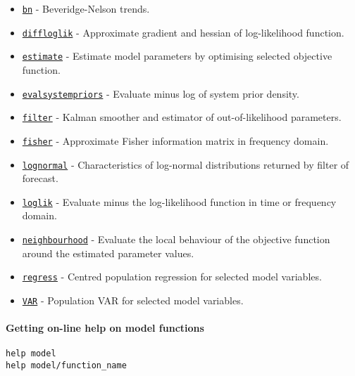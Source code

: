 \begin{itemize}
\itemsep1pt\parskip0pt
\item
  \href{model/bn}{\texttt{bn}} - Beveridge-Nelson trends.
\item
  \href{model/diffloglik}{\texttt{diffloglik}} - Approximate gradient
  and hessian of log-likelihood function.
\item
  \href{model/estimate}{\texttt{estimate}} - Estimate model parameters
  by optimising selected objective function.
\item
  \href{model/evalsystempriors}{\texttt{evalsystempriors}} - Evaluate
  minus log of system prior density.
\item
  \href{model/filter}{\texttt{filter}} - Kalman smoother and estimator
  of out-of-likelihood parameters.
\item
  \href{model/fisher}{\texttt{fisher}} - Approximate Fisher information
  matrix in frequency domain.
\item
  \href{model/lognormal}{\texttt{lognormal}} - Characteristics of
  log-normal distributions returned by filter of forecast.
\item
  \href{model/loglik}{\texttt{loglik}} - Evaluate minus the
  log-likelihood function in time or frequency domain.
\item
  \href{model/neighbourhood}{\texttt{neighbourhood}} - Evaluate the
  local behaviour of the objective function around the estimated
  parameter values.
\item
  \href{model/regress}{\texttt{regress}} - Centred population regression
  for selected model variables.
\item
  \href{model/VAR}{\texttt{VAR}} - Population VAR for selected model
  variables.
\end{itemize}

\paragraph{Getting on-line help on model
functions}\label{getting-on-line-help-on-model-functions}

\begin{verbatim}
help model
help model/function_name
\end{verbatim}




